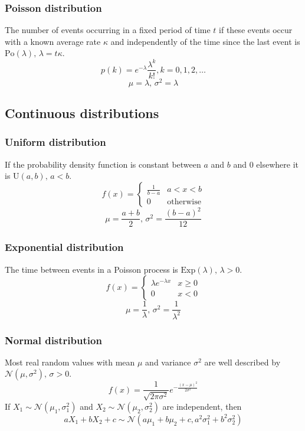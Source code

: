 \subsubsection{Poisson distribution}
The number of events occurring in a fixed period of time $t$ if these events occur with a known average rate $\kappa$ and independently of the time since the last event is $\textrm{Po}(\lambda),\,\lambda=t\kappa$.
\[p(k)=e^{-\lambda}\frac{\lambda^k}{k!}, k=0,1,2,\dots\]
\[\mu=\lambda,\,\sigma^2=\lambda\]

\subsection{Continuous distributions}

\subsubsection{Uniform distribution}
If the probability density function is constant between $a$ and $b$ and 0 elsewhere it is $\textrm{U}(a,b),\,a<b$.
\[f(x) = \left\{
\begin{array}{cl}
\frac{1}{b-a} & a<x<b\\
0 & \textrm{otherwise}
\end{array}\right.\]
\[\mu=\frac{a+b}{2},\,\sigma^2=\frac{(b-a)^2}{12}\]

\subsubsection{Exponential distribution}
The time between events in a Poisson process is $\textrm{Exp}(\lambda),\,\lambda>0$.
\[f(x) = \left\{
\begin{array}{cl}
\lambda e^{-\lambda x} & x\geq0\\
0 & x<0
\end{array}\right.\]
\[\mu=\frac{1}{\lambda},\,\sigma^2=\frac{1}{\lambda^2}\]

\subsubsection{Normal distribution}
Most real random values with mean $\mu$ and variance $\sigma^2$ are well described by $\mathcal{N}(\mu,\sigma^2),\,\sigma>0$.
\[ f(x) = \frac{1}{\sqrt{2\pi\sigma^2}}e^{-\frac{(x-\mu)^2}{2\sigma^2}} \]
If $X_1 \sim \mathcal{N}(\mu_1,\sigma_1^2)$ and $X_2 \sim \mathcal{N}(\mu_2,\sigma_2^2)$ are independent, then
\[ aX_1 + bX_2 + c \sim \mathcal{N}(a\mu_1+b\mu_2+c,a^2\sigma_1^2+b^2\sigma_2^2) \]

